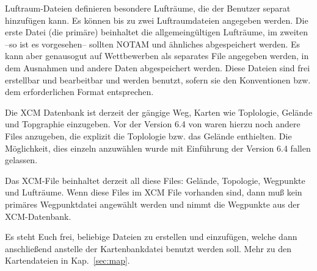 Luftraum-Dateien definieren besondere Lufträume, die der Benutzer separat hinzufügen
kann. Es können bis zu zwei Luftraumdateien
angegeben werden. Die erste Datei (die primäre) beinhaltet die
allgemeingültigen Lufträume, im zweiten --so ist es vorgesehen-- sollten NOTAM und ähnliches
abgespeichert werden. Es kann aber genausogut auf Wettbewerben als separates File
angegeben werden, in dem Ausnahmen und andere Daten abgespeichert werden.
 Diese Dateien sind frei erstellbar und bearbeitbar und werden benutzt,
sofern sie den Konventionen bzw. dem erforderlichen Format entsprechen.


Die XCM Datenbank ist derzeit der gängige Weg,
Karten wie Toplologie, Gelände und Topgraphie einzugeben. Vor der Version 6.4 von \xc waren  hierzu noch
andere Files anzugeben, die explizit die Toplologie bzw. das Gelände enthielten.
Die Möglichkeit, dies einzeln anzuwählen wurde mit Einführung der Version 6.4 fallen gelassen.

Das XCM-File beinhaltet derzeit all diese Files: Gelände, Topologie, Wegpunkte und Lufträume.
Wenn diese Files im XCM File vorhanden sind, dann muß kein primäres Wegpunktdatei
angewählt werden und \xc nimmt die Wegpunkte aus der XCM-Datenbank.

Es steht Euch frei, beliebige Dateien zu erstellen und einzufügen, welche dann anschließend
anstelle der Kartenbankdatei benutzt werden soll. Mehr zu den Kartendateien in Kap.~\ref{sec:map}.


